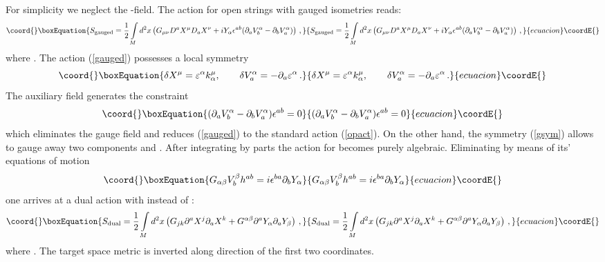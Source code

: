 \documentclass[a4paper,12pt,twoside]{article}
\begin{document}
For simplicity we neglect the \coordHE{}-field.
The action for open strings with gauged isometries reads:
\begin{equation}\coord{}\boxEquation{
S_{{\mbox {\scriptsize {gauged}}}}=\frac 12 \int\limits_M
d^2x \left( G_{\mu\nu}D^a X^\mu D_a X^\nu +iY_\alpha \epsilon^{ab}
(\partial_a V_b^\alpha -\partial_b V_a^\alpha ) \right) \,,
\label{gauged}
}{
S_{{\mbox {\scriptsize {gauged}}}}=\frac 12 \int\limits_M
d^2x \left( G_{\mu\nu}D^a X^\mu D_a X^\nu +iY_\alpha \epsilon^{ab}
(\partial_a V_b^\alpha -\partial_b V_a^\alpha ) \right) \,,
}{ecuacion}\coordE{}\end{equation}
where \coordHE{}. 
The action (\ref{gauged}) possesses a local symmetry
\begin{equation}\coord{}\boxEquation{
\delta X^\mu =\varepsilon^\alpha k_\alpha^\mu ,\qquad
\delta V_a^\alpha =-\partial_a \varepsilon^\alpha \,.
\label{gsym}
}{
\delta X^\mu =\varepsilon^\alpha k_\alpha^\mu ,\qquad
\delta V_a^\alpha =-\partial_a \varepsilon^\alpha \,.
}{ecuacion}\coordE{}\end{equation}
The auxiliary field
\coordHE{} generates the constraint
\begin{equation}\coord{}\boxEquation{
(\partial_a V_b^\alpha -\partial_b V_a^\alpha )\epsilon^{ab}=0
\label{constr}
}{
(\partial_a V_b^\alpha -\partial_b V_a^\alpha )\epsilon^{ab}=0
}{ecuacion}\coordE{}\end{equation}
which eliminates the gauge field \coordHE{} and reduces (\ref{gauged})
to the standard action (\ref{opact}). On the other hand,
the symmetry (\ref{gsym}) 
allows to gauge away two components \coordHE{} and \coordHE{}.
After integrating by parts the
action for \coordHE{} becomes purely algebraic. Eliminating
\coordHE{} by means of its' equations of motion 
\begin{equation}\coord{}\boxEquation{
G_{\alpha\beta}V_b^\beta h^{ab} =i\epsilon^{ba} \partial_b Y_\alpha
\label{Veom}
}{
G_{\alpha\beta}V_b^\beta h^{ab} =i\epsilon^{ba} \partial_b Y_\alpha
}{ecuacion}\coordE{}\end{equation} 
one arrives at a
dual action with \coordHE{} instead of \coordHE{}:
\begin{equation}\coord{}\boxEquation{
S_{{\mbox {\scriptsize {dual}}}}=\frac 12 \int\limits_M
d^2x \left( G_{jk}\partial^a X^j \partial_a X^k +G^{\alpha\beta}
\partial^a Y_\alpha \partial_a Y_\beta \right)\,, 
\label{Sdual}
}{
S_{{\mbox {\scriptsize {dual}}}}=\frac 12 \int\limits_M
d^2x \left( G_{jk}\partial^a X^j \partial_a X^k +G^{\alpha\beta}
\partial^a Y_\alpha \partial_a Y_\beta \right)\,, 
}{ecuacion}\coordE{}\end{equation}
where \coordHE{}. The target space metric is inverted
along direction of the first two coordinates.
\end{document}
